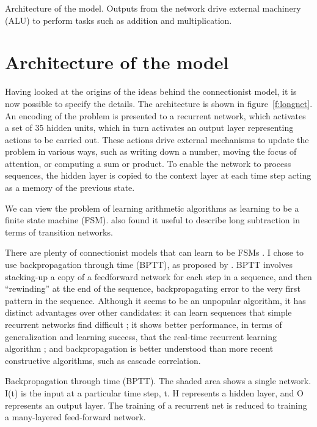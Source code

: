 
\begin{fancyfigure}
\centerline{}
\caption{Architecture of the model. Outputs from the network drive
external machinery (ALU) to perform tasks such as addition and
multiplication.}
\label{f:longnet}
\end{fancyfigure}
\section{Architecture of the model}

Having looked at the origins of the ideas behind the connectionist model,
it is now
possible to specify the details.  The architecture
is shown in figure~\ref{f:longnet}.  An encoding of the problem is
presented to a recurrent network, which activates a set of 35 hidden units,
which in turn activates an output layer representing actions to be carried
out.  These actions drive external mechanisms to update the problem in
various ways, such as writing down a number, moving the focus of attention,
or computing a sum or product.  To enable the network to process
sequences, the hidden layer is copied to the context layer at each time
step acting as a memory of the previous state.

We can view the problem of learning arithmetic algorithms as learning to be
a finite state machine (FSM).  also
found it useful to describe long subtraction in terms of transition
networks.

There are plenty of connectionist models that can learn to be FSMs
\cite{pdp:8,elmafind,servenco,cottlear,clues,willexpe,rcascor}. I chose to
use backpropagation through time (BPTT), as proposed by
.  BPTT involves stacking-up a copy of a
feedforward network for each step in a sequence, and then ``rewinding'' at
the end of the sequence, backpropagating error to the very first pattern in
the sequence. Although it seems to be an unpopular algorithm, it has
distinct advantages over other candidates: it can learn sequences that
simple recurrent networks find difficult \cite{maskforc}; it shows better
performance, in terms of generalization
and learning success, that the real-time
recurrent
learning algorithm \cite{zipssubg};
and backpropagation is better understood than
more recent constructive algorithms, such as cascade correlation.

\begin{fancyfigure}
\centerline{}
\caption{Backpropagation through time (BPTT). The shaded area shows a
single network.  I(t) is the input at a particular time step, t. H
represents a hidden layer, and O represents an output layer. The training
of a recurrent net is reduced to training a many-layered feed-forward
network.}
\label{f:bptt}
\end{fancyfigure}

